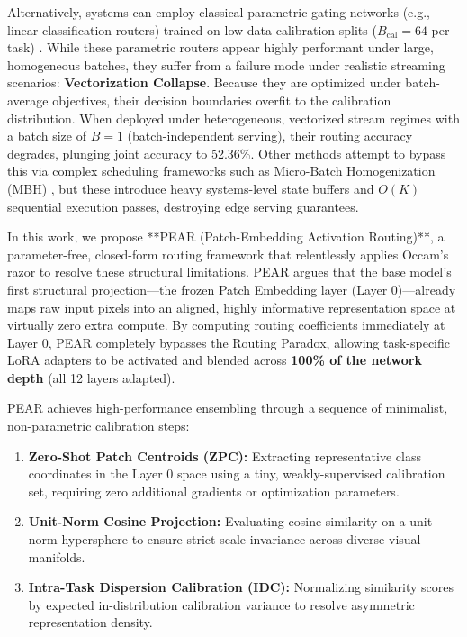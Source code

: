 Alternatively, systems can employ classical parametric gating networks (e.g., linear classification routers) trained on low-data calibration splits ($B_{\text{cal}} = 64$ per task) \cite{pfsr2024}. While these parametric routers appear highly performant under large, homogeneous batches, they suffer from a failure mode under realistic streaming scenarios: \textbf{Vectorization Collapse}. Because they are optimized under batch-average objectives, their decision boundaries overfit to the calibration distribution. When deployed under heterogeneous, vectorized stream regimes with a batch size of $B=1$ (batch-independent serving), their routing accuracy degrades, plunging joint accuracy to 52.36\%. Other methods attempt to bypass this via complex scheduling frameworks such as Micro-Batch Homogenization (MBH) \cite{pfsr2024}, but these introduce heavy systems-level state buffers and $O(K)$ sequential execution passes, destroying edge serving guarantees.

In this work, we propose **PEAR (Patch-Embedding Activation Routing)**, a parameter-free, closed-form routing framework that relentlessly applies Occam's razor to resolve these structural limitations. PEAR argues that the base model's first structural projection—the frozen Patch Embedding layer (Layer 0)—already maps raw input pixels into an aligned, highly informative representation space at virtually zero extra compute. By computing routing coefficients immediately at Layer 0, PEAR completely bypasses the Routing Paradox, allowing task-specific LoRA adapters to be activated and blended across \textbf{100\% of the network depth} (all 12 layers adapted). 

PEAR achieves high-performance ensembling through a sequence of minimalist, non-parametric calibration steps:
\begin{enumerate}
    \item \textbf{Zero-Shot Patch Centroids (ZPC):} Extracting representative class coordinates in the Layer 0 space using a tiny, weakly-supervised calibration set, requiring zero additional gradients or optimization parameters.
    \item \textbf{Unit-Norm Cosine Projection:} Evaluating cosine similarity on a unit-norm hypersphere to ensure strict scale invariance across diverse visual manifolds.
    \item \textbf{Intra-Task Dispersion Calibration (IDC):} Normalizing similarity scores by expected in-distribution calibration variance to resolve asymmetric representation density.
\end{enumerate}

